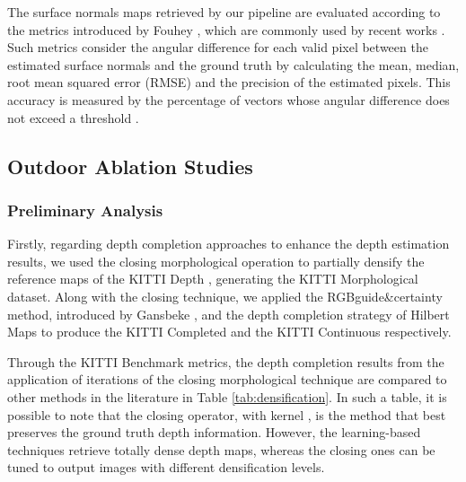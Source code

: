 \documentclass[5p]{elsarticle}
\begin{document}
The surface normals maps retrieved by our pipeline are evaluated according to the metrics introduced by Fouhey \etal\cite{fouhey2013data}, which are commonly used by recent works \cite{bansal2016marr,wang2016surge,qi2018geonet,zhang2019pattern}. Such metrics consider the angular difference for each valid pixel between the estimated surface normals and the ground truth by calculating the mean, median, root mean squared error (RMSE) and the precision of the estimated pixels. This accuracy is measured by the percentage of vectors whose angular difference does not exceed a threshold .

\subsection{Outdoor Ablation Studies}

\subsubsection{Preliminary Analysis}

Firstly, regarding depth completion approaches to enhance the depth estimation results, we used the closing morphological operation to partially densify the reference maps of the KITTI Depth \cite{uhrig2017sparsity}, generating the KITTI Morphological dataset. Along with the closing technique, we applied the RGB\textunderscore guide\&certainty method, introduced by Gansbeke \etal\cite{van2019sparse}, and the depth completion strategy of Hilbert Maps \cite{dos2019sparse} to produce the KITTI Completed and the KITTI Continuous respectively. 

Through the KITTI Benchmark metrics, the depth completion results from the application of  iterations of the closing morphological technique are compared to other methods in the literature in Table \ref{tab:densification}. In such a table, it is possible to note that the closing operator, with kernel , is the method that best preserves the ground truth depth information. However, the learning-based techniques retrieve totally dense depth maps, whereas the closing ones can be tuned to output images with different densification levels.
\end{document}
